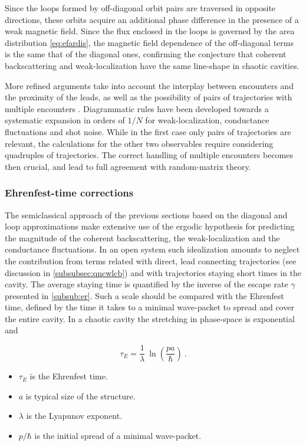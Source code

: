 \documentclass[a4paper,10pt]{article}
\newcommand{\ET}{\tau_{\scriptscriptstyle E}}
\newcommand{\nin}{\noindent}
\newcommand{\be}{\begin{equation}}
\newcommand{\ee}{\end{equation}}
\begin{document}
\nin Since the loops formed by off-diagonal orbit pairs are traversed in opposite directions, these orbits acquire an additional phase difference in the presence of a weak magnetic field. Since the flux enclosed in the loops is governed by the area distribution \eqref{eq:efardis}, the magnetic field dependence of the off-diagonal terms is the same that of the diagonal ones, confirming the conjecture that coherent backscattering and weak-localization have the same line-shape in chaotic cavities.

\nin More refined arguments take into account the interplay between encounters and the proximity of the leads, as well as the possibility of pairs of trajectories with multiple encounters \cite{Haacke_2006}. Diagrammatic rules have been developed \cite{Haacke_2007} towards a systematic expansion in orders of $1/N$ for weak-localization, conductance fluctuations and shot noise. While in the first case only pairs of trajectories are relevant, the calculations for the other two observables require considering quadruples of trajectories. The correct handling of multiple encounters becomes then crucial, and lead to full agreement with random-matrix theory. 

\subsubsection{Ehrenfest-time corrections}
\label{subsubsec:etc}

The semiclassical approach of the previous sections based on the diagonal and loop approximations make extensive use of the ergodic hypothesis for predicting the magnitude of the coherent backscattering, the weak-localization and the conductance fluctuations. In an open system such idealization amounts to neglect the contribution from terms related with direct, lead connecting trajectories (see discussion in \ref{subsubsec:qncwlcb}) and with trajectories staying short times in the cavity. The average staying time is quantified by the inverse of the escape rate $\gamma$ presented in \ref{subsub:er}. Such a scale should be compared with the Ehrenfest time, defined by the time it takes to a minimal wave-packet to spread and cover the entire cavity. In a chaotic cavity the stretching in phase-space is exponential and 

\be
\ET = \frac{1}{\lambda} \
\ln{\left(\frac{p a}{\hbar}\right)} \ .
\label{eq:ET}
\ee

\begin{itemize}

\item $\ET$ is the Ehrenfest time.

\item $a$ is typical size of the structure.

\item $\lambda$ is the Lyapunov exponent.  

\item $p/\hbar$ is the initial spread of a minimal wave-packet.

\end{itemize} 
\end{document}
